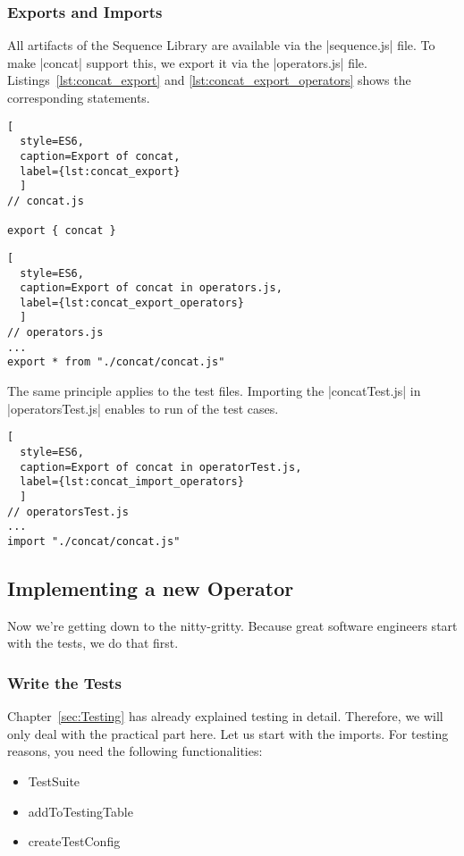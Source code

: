\subsubsection{Exports and Imports}
All artifacts of the Sequence Library are available via the |sequence.js| file.
To make |concat| support this, we export it via the |operators.js| file.
Listings~\ref{lst:concat_export} and \ref{lst:concat_export_operators} shows the corresponding statements.

\begin{lstlisting}[
  style=ES6, 
  caption=Export of concat,
  label={lst:concat_export}
  ]
// concat.js

export { concat }
\end{lstlisting}



\begin{lstlisting}[
  style=ES6, 
  caption=Export of concat in operators.js,
  label={lst:concat_export_operators}
  ]
// operators.js
...
export * from "./concat/concat.js"
\end{lstlisting}

The same principle applies to the test files. Importing the |concatTest.js| in
|operatorsTest.js| enables to run of the test cases.

\begin{lstlisting}[
  style=ES6, 
  caption=Export of concat in operatorTest.js,
  label={lst:concat_import_operators}
  ]
// operatorsTest.js
...
import "./concat/concat.js"
\end{lstlisting}

\subsection{Implementing a new Operator}
\label{subsub:Implementing a new Operator}
Now we're getting down to the nitty-gritty.
Because great software engineers start with the tests, we do that first.

\subsubsection{Write the Tests}
\label{subsub:Write the Tests}
Chapter~\ref{sec:Testing} has already explained testing in detail. Therefore, we will only deal 
with the practical part here.
\newline
Let us start with the imports. For testing reasons, you need the following
functionalities:

\begin{itemize}
  \item{TestSuite}
  \item{addToTestingTable}
  \item{createTestConfig}
\end{itemize}

